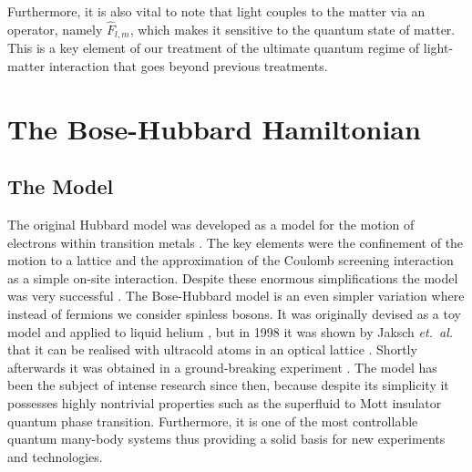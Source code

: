 Furthermore, it is also vital to note that light couples to the matter
via an operator, namely $\hat{F}_{l,m}$, which makes it sensitive to
the quantum state of matter. This is a key element of our treatment of
the ultimate quantum regime of light-matter interaction that goes
beyond previous treatments.

\section{The Bose-Hubbard Hamiltonian}

\subsection{The Model}

The original Hubbard model was developed as a model for the motion of
electrons within transition metals \cite{hubbard1963}. The key
elements were the confinement of the motion to a lattice and the
approximation of the Coulomb screening interaction as a simple on-site
interaction. Despite these enormous simplifications the model was very
successful \cite{leggett}. The Bose-Hubbard model is an even simpler
variation where instead of fermions we consider spinless bosons. It
was originally devised as a toy model and applied to liquid helium
\cite{fisher1989}, but in 1998 it was shown by Jaksch \emph{et.~al.}
that it can be realised with ultracold atoms in an optical lattice
\cite{jaksch1998}. Shortly afterwards it was obtained in a
ground-breaking experiment \cite{greiner2002}. The model has been the
subject of intense research since then, because despite its simplicity
it possesses highly nontrivial properties such as the superfluid to
Mott insulator quantum phase transition. Furthermore, it is one of the
most controllable quantum many-body systems thus providing a solid
basis for new experiments and technologies.

